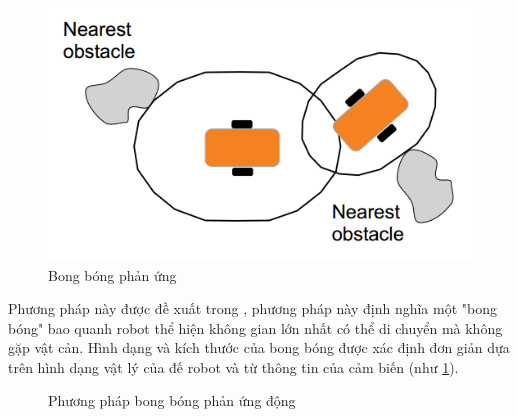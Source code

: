 \begin{figure}[htbp]
  \centering
  \includegraphics[width=0.6\linewidth]{figures/bubble-band.png}
  \caption{Bong bóng phản ứng \cite{Susnea2009}}
  \label{fig:bubble-band}
\end{figure}

Phương pháp này được đề xuất trong \cite{Quinlan1993}, phương pháp này định nghĩa một "bong bóng" bao quanh robot thể hiện không gian lớn nhất có thể di chuyển mà không gặp vật cản. Hình dạng và kích thước của bong bóng được xác định đơn giản dựa trên hình dạng vật lý của đế robot và từ thông tin của cảm biến (như \figurename{ \ref{fig:bubble-band}}).

\begin{figure}
	\centering
	\hspace{8pt}
	\caption{Phương pháp bong bóng phản ứng động}
	\label{fig:bubbleRebound}
\end{figure}

